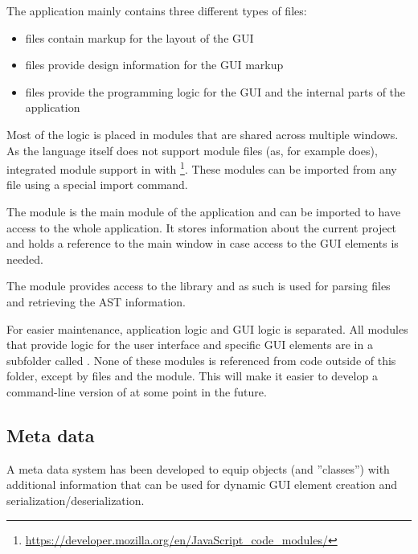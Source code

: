 The application mainly contains three different types of files:

\begin{itemize}\addtolength{\itemsep}{-0.5\baselineskip}
\item {} files contain markup for the layout of the GUI
\item {} files provide design information for the GUI markup
\item {} files provide the programming logic for the GUI and the internal parts of the application
\end{itemize}

Most of the  logic is placed in modules that are shared across multiple windows. As the  language itself does not support module files (as, for example  does),  integrated module support in  with \footnote{\url{https://developer.mozilla.org/en/JavaScript_code_modules/}}. These modules can be imported from any  file using a special import command.

The  module is the main module of the application and can be imported to have access to the whole application. It stores information about the current project and holds a reference to the main window in case access to the GUI elements is needed.

The  module provides access to the  library and as such is used for parsing  files and retrieving the AST information.

For easier maintenance, application logic and GUI logic is separated. All modules that provide logic for the user interface and specific GUI elements are in a subfolder called . None of these modules is referenced from code outside of this folder, except by  files and the  module. This will make it easier to develop a command-line version of  at some point in the future.

\subsection{Meta data}
\label{sec:MetaData}

A meta data system has been developed to equip  objects (and ''classes'') with additional information that can be used for dynamic GUI element creation and serialization/deserialization.

